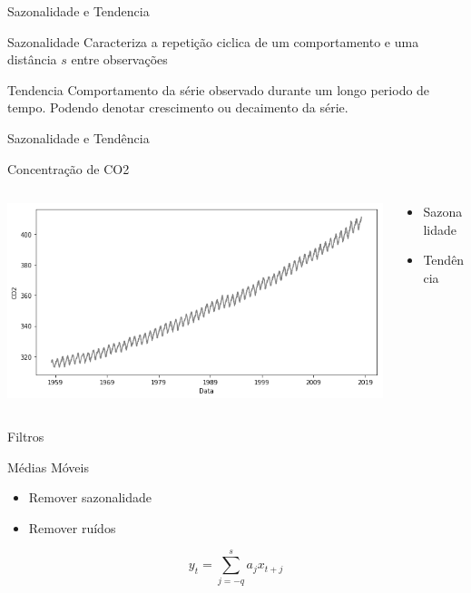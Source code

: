\documentclass[compress,aspectratio=149,brazil]{beamer}
\begin{document}
\begin{frame}{Sazonalidade e Tendencia}
    \begin{block}{Sazonalidade}
        Caracteriza a repetição ciclica de um comportamento e uma distância
        $s$ entre observações
    \end{block}
    \begin{block}{Tendencia}
        Comportamento da série observado durante um longo periodo de tempo.
        Podendo denotar crescimento ou decaimento da série.
    \end{block}
\end{frame}

\begin{frame}{Sazonalidade e Tendência}
    \begin{block}{Concentração de CO2}
        \begin{columns}
            \begin{column}{.7\textwidth}
                \includegraphics[width=\textwidth]{../images/co2.png}
            \end{column}
            \begin{column}{.3\textwidth}
                \begin{itemize}
                    \item Sazonalidade
                    \item Tendência
                \end{itemize}
            \end{column}
        \end{columns}
    \end{block}
\end{frame}

\begin{frame}{Filtros}
    \begin{block}{Médias Móveis}
        \begin{itemize}
            \item Remover sazonalidade
            \item Remover ruídos
        \end{itemize}
        \[ y_t = \sum_{j = -q}^{s}{a_{j}x_{t+j}} \]
    \end{block}
\end{frame}
\end{document}
